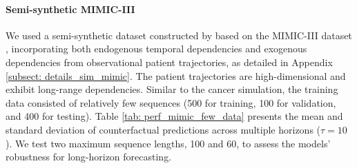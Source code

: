 \documentclass{article}
\theoremstyle{plain}
\theoremstyle{definition}
\theoremstyle{remark}
\begin{document}
\paragraph{Semi-synthetic MIMIC-III} We used a semi-synthetic dataset constructed by \cite{Melnychuk2022CausalTF} based on the MIMIC-III dataset \citep{johnson2016mimic}, incorporating both endogenous temporal dependencies and exogenous dependencies from observational patient trajectories, as detailed in Appendix \ref{subsect: details_sim_mimic}. The patient trajectories are high-dimensional and exhibit long-range dependencies. Similar to the cancer simulation, the training data consisted of relatively few sequences (500 for training, 100 for validation, and 400 for testing). Table \ref{tab: perf_mimic_few_data} presents the mean and standard deviation of counterfactual predictions across multiple horizons ($\tau = 10$). We test two maximum sequence lengths, 100 and 60, to assess the models' robustness for long-horizon forecasting.
\begin{table}[t]
 \caption{Evolution of RMSEs for the semi-synthetic MIMIC III, sequence length 100.}
 \centering
{}
\label{tab: perf_mimic_few_data}
\end{table}
\end{document}
